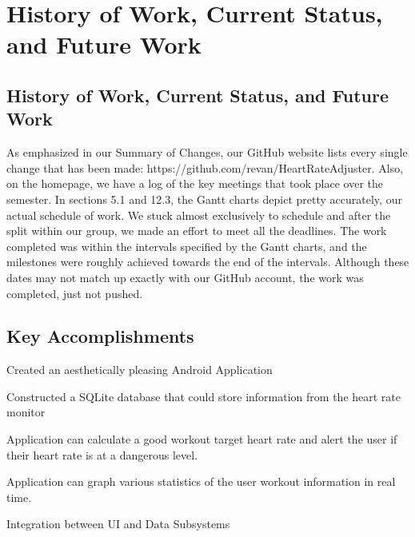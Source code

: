 \documentclass[letterpaper,english, 12pt]{scrreprt}
\begin{document}
\chapter*{History of Work, Current Status, and Future Work}

\section{History of Work, Current Status, and Future Work}
As emphasized in our Summary of Changes, our GitHub website lists every single change that has been made: https://github.com/revan/HeartRateAdjuster. Also, on the homepage, we have a log of the key meetings that took place over the semester. 
In sections 5.1 and 12.3, the Gantt charts depict pretty accurately, our actual schedule of work. We stuck almost exclusively to schedule and after the split within our group, we made an effort to meet all the deadlines. The work completed was within the intervals specified by the Gantt charts, and the milestones were roughly achieved towards the end of the intervals. Although these dates may not match up exactly with our GitHub account, the work was completed, just not pushed. 

\section{Key Accomplishments}
\begin{description}
\item Created an aesthetically pleasing Android Application
\item Constructed a SQLite database that could store information from the heart rate monitor
\item Application can calculate a good workout target heart rate and alert the user if their heart rate is at a dangerous level.
\item Application can graph various statistics of the user workout information in real time.
\item Integration between UI and Data Subsystems
\end{description}
\end{document}
